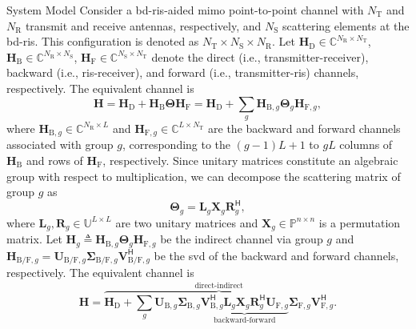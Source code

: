 \documentclass[journal]{IEEEtran}
\begin{document}
\begin{section}{System Model}
		Consider a \gls{bd}-\gls{ris}-aided \gls{mimo} point-to-point channel with $N_\mathrm{T}$ and $N_\mathrm{R}$ transmit and receive antennas, respectively, and $N_\mathrm{S}$ scattering elements at the \gls{bd}-\gls{ris}.
		This configuration is denoted as $N_\mathrm{T} \times N_\mathrm{S} \times N_\mathrm{R}$.
		Let $\mathbf{H}_\mathrm{D} \in \mathbb{C}^{N_\mathrm{R} \times N_\mathrm{T}}$, $\mathbf{H}_\mathrm{B} \in \mathbb{C}^{N_\mathrm{R} \times N_\mathrm{S}}$, $\mathbf{H}_\mathrm{F} \in \mathbb{C}^{N_\mathrm{S} \times N_\mathrm{T}}$ denote the direct (i.e., transmitter-receiver), backward (i.e., \gls{ris}-receiver), and forward (i.e., transmitter-\gls{ris}) channels, respectively.
		The equivalent channel is
		\begin{equation}
			\label{eq:channel}
			\mathbf{H} = \mathbf{H}_\mathrm{D} + \mathbf{H}_\mathrm{B} \mathbf{\Theta} \mathbf{H}_\mathrm{F} = \mathbf{H}_\mathrm{D} + \sum_g \mathbf{H}_{\mathrm{B},g} \mathbf{\Theta}_g \mathbf{H}_{\mathrm{F},g},
		\end{equation}
		where $\mathbf{H}_{\mathrm{B},g} \in \mathbb{C}^{N_\mathrm{R} \times L}$ and $\mathbf{H}_{\mathrm{F},g} \in \mathbb{C}^{L \times N_\mathrm{T}}$ are the backward and forward channels associated with group $g$, corresponding to the $(g{-}1)L{+}1$ to $gL$ columns of $\mathbf{H}_\mathrm{B}$ and rows of $\mathbf{H}_\mathrm{F}$, respectively.
		Since unitary matrices constitute an algebraic group with respect to multiplication, we can decompose the scattering matrix of group $g$ as
		\begin{equation}
			\label{eq:ris_decompose_group}
			\mathbf{\Theta}_g = \mathbf{L}_g \mathbf{X}_g \mathbf{R}_g^\mathsf{H},
		\end{equation}
		where $\mathbf{L}_g, \mathbf{R}_g \in \mathbb{U}^{L \times L}$ are two unitary matrices and $\mathbf{X}_g \in \mathbb{P}^{n \times n}$ is a permutation matrix.
		Let $\mathbf{H}_g \triangleq \mathbf{H}_{\mathrm{B},g} \mathbf{\Theta}_g \mathbf{H}_{\mathrm{F},g}$ be the indirect channel via group $g$ and $\mathbf{H}_{\mathrm{B/F},g} = \mathbf{U}_{\mathrm{B/F},g} \mathbf{\Sigma}_{\mathrm{B/F},g} \mathbf{V}_{\mathrm{B/F},g}^\mathsf{H}$ be the \gls{svd} of the backward and forward channels, respectively.
		The equivalent channel is
		\begin{equation}
			\label{eq:channel_svd}
			\mathbf{H} = \overbrace{\mathbf{H}_\mathrm{D} + \sum_g \mathbf{U}_{\mathrm{B},g} \mathbf{\Sigma}_{\mathrm{B},g} \underbrace{\mathbf{V}_{\mathrm{B},g}^\mathsf{H} \mathbf{L}_g \mathbf{X}_g \mathbf{R}_g^\mathsf{H} \mathbf{U}_{\mathrm{F},g}}_\text{backward-forward} \mathbf{\Sigma}_{\mathrm{F},g} \mathbf{V}_{\mathrm{F},g}^\mathsf{H}}^\text{direct-indirect}.
		\end{equation}


\end{section}
\end{document}
